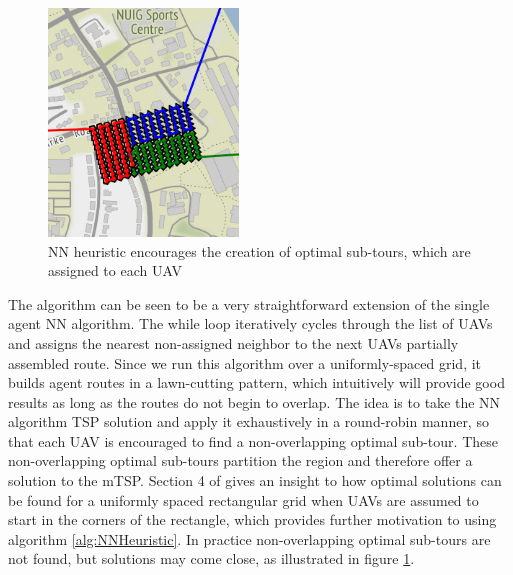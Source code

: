 \begin{figure}
\includegraphics[width=0.45\textwidth]{Chapters/MultiAgentCoverage/Figs/RAVRoutingNUIGCropped.png}
\caption{NN heuristic encourages the creation of optimal sub-tours, which are assigned to each UAV}
\label{fig:NNPartitioning}
\end{figure}
The algorithm can be seen to be a very straightforward extension of the single agent NN algorithm. The while loop iteratively cycles through the list of UAVs and assigns the nearest non-assigned neighbor to the next UAVs partially assembled route. Since we run this algorithm over a uniformly-spaced grid, it builds agent routes in a lawn-cutting pattern, which intuitively will provide good results as long as the routes do not begin to overlap. The idea is to take the NN algorithm TSP solution and apply it exhaustively in a round-robin manner, so that each UAV is encouraged to find a non-overlapping optimal sub-tour. These non-overlapping optimal sub-tours partition the region and therefore offer a solution to the mTSP. Section 4 of \cite{Hungerlander2018TheGrids} gives an insight to how optimal solutions can be found for a uniformly spaced rectangular grid when UAVs are assumed to start in the corners of the rectangle, which provides further motivation to using algorithm \ref{alg:NNHeuristic}. In practice non-overlapping optimal sub-tours are not found, but solutions may come close, as illustrated in figure \ref{fig:NNPartitioning}. 



